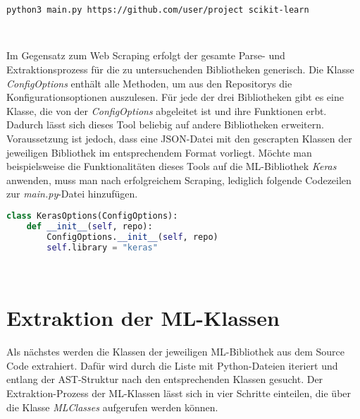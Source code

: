 \documentclass[german,bachelor]{swsLeipzig}
\begin{document}
\noindent\begin{minipage}{\linewidth}
\begin{lstlisting}[language=bash, frame=single, label=execute_coop, basicstyle=\small, caption={Kommandozeilenbefehl für die Extraktion von Konfigurationsoptionen von scikit-learn},captionpos=b]
python3 main.py https://github.com/user/project scikit-learn
\end{lstlisting}
\end{minipage}
\

Im Gegensatz zum Web Scraping erfolgt der gesamte Parse- und Extraktionsprozess für die zu untersuchenden Bibliotheken generisch.
Die Klasse \textit{ConfigOptions} enthält alle Methoden, um aus den Repositorys die Konfigurationsoptionen auszulesen.
Für jede der drei Bibliotheken gibt es eine Klasse, die von der \textit{ConfigOptions} abgeleitet ist und ihre Funktionen erbt.
Dadurch lässt sich dieses Tool beliebig auf andere Bibliotheken erweitern.
Voraussetzung ist jedoch, dass eine JSON-Datei mit den gescrapten Klassen der jeweiligen Bibliothek im entsprechendem Format vorliegt.
Möchte man beispielsweise die Funktionalitäten dieses Tools auf die ML-Bibliothek \textit{Keras} anwenden, muss man nach erfolgreichem Scraping,
lediglich folgende Codezeilen zur \textit{main.py}-Datei hinzufügen.\\

\noindent\begin{minipage}{\linewidth}
\begin{lstlisting}[language=Python, frame=single, label=keras,  basicstyle=\small, caption={Implementation einer Klasse zur Extraktion von Konfigurationsoptionen einer weiteren ML-Bibliothek},captionpos=b]
class KerasOptions(ConfigOptions):
    def __init__(self, repo):
        ConfigOptions.__init__(self, repo)
        self.library = "keras"
\end{lstlisting}
\end{minipage}
\

\section{Extraktion der ML-Klassen}\label{Classes}
Als nächstes werden die Klassen der jeweiligen ML-Bibliothek aus dem Source Code extrahiert.
Dafür wird durch die Liste mit Python-Dateien iteriert und entlang der AST-Struktur nach den entsprechenden Klassen gesucht.
Der Extraktion-Prozess der ML-Klassen lässt sich in vier Schritte einteilen, die über die Klasse
\textit{MLClasses} aufgerufen werden können.
\end{document}
